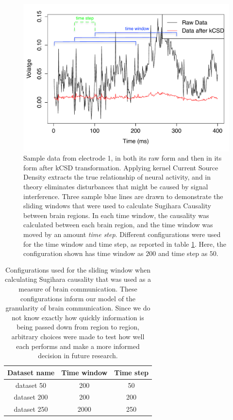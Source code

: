 \documentclass[journal,12pt,onecolumn,draftclsnofoot]{IEEEtran}  %
\begin{document}
\begin{figure}[H]
  \includegraphics[width=\linewidth]{figures/sample_eeg_signal_with_kcsd_edited.pdf}
  \caption{Sample data from electrode 1, in both its raw form and then in its form after kCSD transformation. Applying kernel Current Source Density extracts the true relationship of neural activity, and in theory eliminates disturbances that might be caused by signal interference. Three sample blue lines are drawn to demonstrate the sliding windows that were used to calculate Sugihara Causality between brain regions. In each time window, the causality was calculated between each brain region, and the time window was moved by an amount \textit{time step}. Different configurations were used for the time window and time step, as reported in table \ref{tab:sliding_window_configuration}. Here, the configuration shown has time window as $200$ and time step as $50$.}
  \label{fig:example_eeg_and_kcsd}
\end{figure}

\begin{table}[H]
\centering
\caption{Configurations used for the sliding window when calculating Sugihara causality that was used as a measure of brain communication. These configurations inform our model of the granularity of brain communication. Since we do not know exactly how quickly information is being passed down from region to region, arbitrary choices were made to test how well each performs and make a more informed decision in future research.}
\label{tab:sliding_window_configuration}
\begin{tabular}{|c|c|c|}
\hline
 Dataset name &  Time window &  Time step \\ \hline
 
 dataset 50 & 200 & 50  \\ \hline
 dataset 200 & 200 & 200 \\ \hline
 dataset 250 & 2000 & 250  \\ \hline
\end{tabular}
\end{table}
\end{document}
